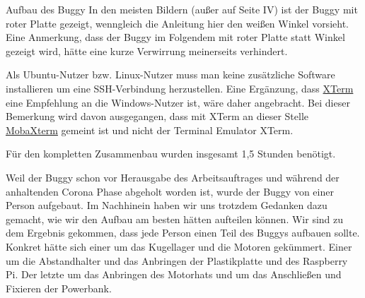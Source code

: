 \documentclass[12pt]{report}
\begin{document}
\begin{section}{Aufbau des Buggy}
In den meisten Bildern (außer auf Seite IV) ist der Buggy mit roter Platte gezeigt, wenngleich die Anleitung hier den weißen Winkel vorsieht. Eine Anmerkung, dass der Buggy im Folgendem mit roter Platte statt Winkel gezeigt wird, hätte eine kurze Verwirrung meinerseits verhindert.

Als Ubuntu-Nutzer bzw. Linux-Nutzer muss man keine zusätzliche Software installieren um eine SSH-Verbindung herzustellen. Eine Ergänzung, dass \href{https://invisible-island.net/xterm/}{XTerm} eine Empfehlung an die Windows-Nutzer ist, wäre daher angebracht. Bei dieser Bemerkung wird davon ausgegangen, dass mit XTerm an dieser Stelle \href{https://mobaxterm.mobatek.net/}{MobaXterm} gemeint ist und nicht der Terminal Emulator XTerm. 

Für den kompletten Zusammenbau wurden insgesamt 1,5 Stunden benötigt.

Weil der Buggy schon vor Herausgabe des Arbeitsauftrages und während der anhaltenden Corona Phase abgeholt worden ist, wurde der Buggy von einer Person aufgebaut. Im Nachhinein haben wir uns trotzdem Gedanken dazu gemacht, wie wir den Aufbau am besten hätten aufteilen können. Wir sind zu dem Ergebnis gekommen, dass jede Person einen Teil des Buggys aufbauen sollte. Konkret hätte sich einer um das Kugellager und die Motoren gekümmert. Einer um die Abstandhalter und das Anbringen der Plastikplatte und des Raspberry Pi. Der letzte um das Anbringen des Motorhats und um das Anschließen und Fixieren der Powerbank.

\end{section}
\end{document}
